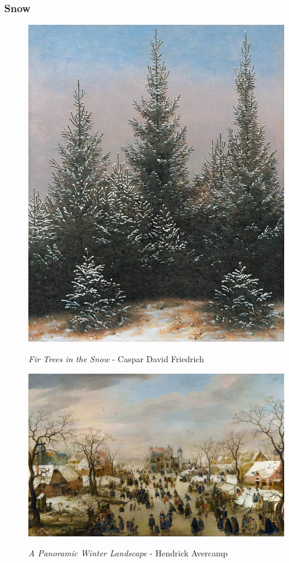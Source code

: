 \documentclass[a4paper]{article}
\begin{document}
\newpage
\subsubsection{Snow}

\begin {figure}[h!]
\centering
\begin{minipage}[b]{.49\textwidth}
	\centering
	\includegraphics[width=\textwidth]{SnowPaintings/_Ext__Fir_Trees_in_the_Snow_-_Caspar_David_Friedrch.jpg}
    \caption{\emph{Fir Trees in the Snow} - Caspar David Friedrich}
\end{minipage}
\hfill
\begin{minipage}[b]{.49\textwidth}
	\centering
	\includegraphics[width=\textwidth]{SnowPaintings/_Ext__A_Panoramic_Winter_Landscape_-_Hendrick_Avercamp.jpg}
    \caption{\emph{A Panoramic Winter Landscape} - Hendrick Avercamp}
\end{minipage}
\end{figure}
\end{document}
